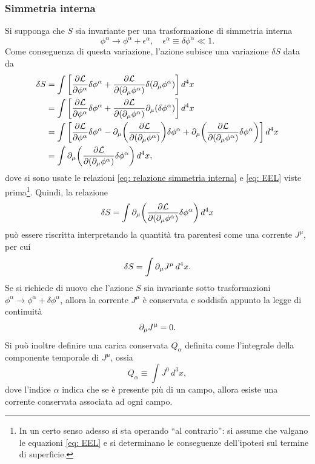 \subsubsection{Simmetria interna}
Si supponga che $S$ sia invariante per una trasformazione di simmetria interna
\begin{equation}
    \phi^\alpha \to \phi^\alpha +\epsilon^\alpha,\quad\epsilon^\alpha\equiv\delta\phi^\alpha\ll1.
\end{equation}
Come conseguenza di questa variazione, l'azione subisce una variazione $\delta S$ data da
\begin{equation}
    \begin{split}
        \delta S &= \int\bigg[\frac{\partial\mathcal{L}}{\partial\phi^\alpha}\delta\phi^\alpha + \frac{\partial\mathcal{L}}{\partial(\partial_\mu\phi^\alpha)}\delta(\partial_\mu\phi^\alpha)\bigg]\,d^4x \\
        &= \int\bigg[\frac{\partial\mathcal{L}}{\partial\phi^\alpha}\delta\phi^\alpha + \frac{\partial\mathcal{L}}{\partial(\partial_\mu\phi^\alpha)}\partial_\mu(\delta\phi^\alpha)\bigg]\,d^4x \\
        &= \int\bigg[\frac{\partial\mathcal{L}}{\partial\phi^\alpha}\delta\phi^\alpha - \partial_\mu\bigg(\frac{\partial\mathcal{L}}{\partial(\partial_\mu\phi^\alpha)}\bigg)\delta\phi^\alpha + \partial_\mu\bigg(\frac{\partial\mathcal{L}}{\partial(\partial_\mu\phi^\alpha)}\delta\phi^\alpha\bigg) \bigg]\,d^4x \\
        &=  \int\partial_\mu\bigg(\frac{\partial\mathcal{L}}{\partial(\partial_\mu\phi^\alpha)}\delta\phi^\alpha\bigg)\,d^4x,
    \end{split}
\end{equation}
dove si sono usate le relazioni \eqref{eq: relazione simmetria interna} e \eqref{eq: EEL} viste prima\footnote{In un certo senso adesso si sta operando ``al contrario'': si assume che valgano le equazioni \eqref{eq: EEL} e si determinano le conseguenze dell'ipotesi sul termine di superficie.}. Quindi, la relazione 
\begin{equation}
\label{eq: variazione azione TdN simmetria interna}
    \delta S = \int\partial_\mu\bigg(\frac{\partial\mathcal{L}}{\partial(\partial_\mu\phi^\alpha)}\delta\phi^\alpha\bigg)\,d^4x
\end{equation}
può essere riscritta interpretando la quantità tra parentesi come una corrente $J^\mu$, per cui
\begin{equation}
    \delta S = \int \partial_\mu J^\mu\,d^4x.
\end{equation}
Se si richiede di nuovo che l'azione $S$ sia invariante sotto trasformazioni $\phi^\alpha \to \phi^\alpha + \delta\phi^\alpha$, allora la corrente $J^\mu$ è conservata e soddisfa appunto la legge di continuità
\begin{equation}
\label{eq: eq. continuità simmetria interna}
    \partial_\mu J^\mu = 0.
\end{equation}
Si può inoltre definire una carica conservata $Q_\alpha$ definita come l'integrale della componente temporale di $J^\mu$, ossia
\begin{equation}
    Q_\alpha \equiv \int J^0\,d^3x,
\end{equation}
dove l'indice $\alpha$ indica che se è presente più di un campo, allora esiste una corrente conservata associata ad ogni campo.

